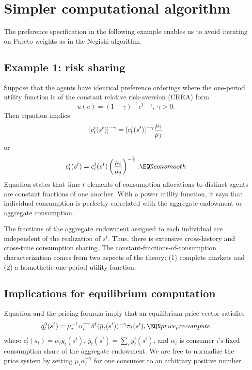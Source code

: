 \section{Simpler computational algorithm}
The preference specification in the following example enables us to avoid iterating on Pareto weights as in
the Negishi algorithm.
\subsection{Example 1: risk sharing}\label{sec:ex1_risksharing}%
\noindent Suppose that the agents have identical preference orderings where
the one-period utility function is of the constant
relative risk-aversion (CRRA) form
$$ u(c) = (1-\gamma)^{-1} c^{1-\gamma} , \ \gamma > 0.$$
Then equation  implies
$$ [c_t^i(s^t)]^{-\gamma}
   = [c_t^j(s^t)]^{-\gamma} {\mu_i \over \mu_j} $$
or
$$ c_t^i(s^t) = c_t^j(s^t) \left({\mu_i \over \mu_j}\right)^{-{1 \over  \gamma}}.
    \EQN consmooth $$
Equation  states that time $t$ elements
of consumption allocations  to
distinct agents are
constant fractions of one another. With a power utility function,
 it says that  individual
consumption is perfectly correlated with the aggregate endowment
or aggregate consumption.   

The fractions  of the aggregate endowment assigned to each
individual are independent of the realization of $s^t$.    Thus,
there is extensive cross-history and cross-time consumption
sharing. The constant-fractions-of-consumption characterization
comes from two aspects of the theory: (1) complete markets
and (2) a  homothetic one-period utility function.


\subsection{Implications for equilibrium computation}\label{sec:compeasy}%
\noindent Equation  and the pricing formula
 imply that an equilibrium price vector satisfies
$$ q_t^0(s^t) = \mu_i^{-1} \alpha_i^{-\gamma} \beta^t (\overline y_t(s^t))^{-\gamma} \pi_t(s^t) , \EQN price_precompute$$
where $c_t^i(s_t) = \alpha_i \overline y_t(s^t)$, $\overline y_t(s^t) = \sum_i y_t^i(s^t)$, and $\alpha_i$ is consumer $i$'s
fixed consumption share of the aggregate endowment.
We are free to normalize the price system by setting $\mu_i \alpha_i^{-\gamma}$ for one consumer to an arbitrary positive number.


